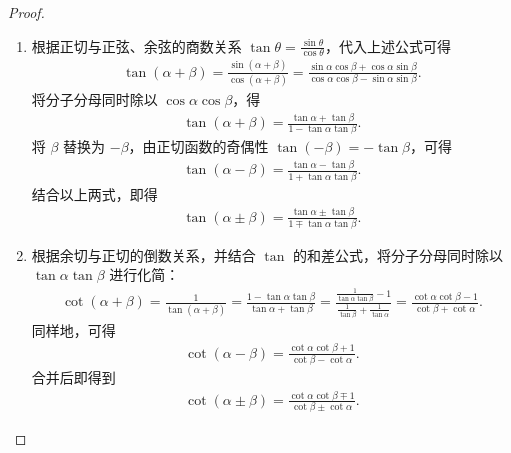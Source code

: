 \documentclass[../../main.tex]{subfiles}%
\begin{document}
\begin{proof}
\begin{enumerate}[(1)]
\item 根据正切与正弦、余弦的商数关系 \(\tan\theta = \frac{\sin\theta}{\cos\theta}\)，代入上述公式可得
\begin{align*}
\tan(\alpha + \beta) = \frac{\sin(\alpha + \beta)}{\cos(\alpha + \beta)} = \frac{\sin\alpha\cos\beta + \cos\alpha\sin\beta}{\cos\alpha\cos\beta - \sin\alpha\sin\beta}.
\end{align*}
将分子分母同时除以 \(\cos\alpha\cos\beta\)，得
\begin{align*}
\tan(\alpha + \beta) = \frac{\tan\alpha + \tan\beta}{1 - \tan\alpha\tan\beta}.
\end{align*}
将 \(\beta\) 替换为 \(-\beta\)，由正切函数的奇偶性 \(\tan(-\beta) = -\tan\beta\)，可得
\begin{align*}
\tan(\alpha - \beta) = \frac{\tan\alpha - \tan\beta}{1 + \tan\alpha\tan\beta}.
\end{align*}
结合以上两式，即得
\begin{align*}
\tan(\alpha \pm \beta) = \frac{\tan\alpha \pm \tan\beta}{1 \mp \tan\alpha\tan\beta}.
\end{align*}

\item 根据余切与正切的倒数关系，并结合 \(\tan\) 的和差公式，将分子分母同时除以 \(\tan\alpha\tan\beta\) 进行化简：
\begin{align*}
\cot(\alpha + \beta) = \frac{1}{\tan(\alpha + \beta)} = \frac{1 - \tan\alpha\tan\beta}{\tan\alpha + \tan\beta} = \frac{\frac{1}{\tan\alpha\tan\beta} - 1}{\frac{1}{\tan\beta} + \frac{1}{\tan\alpha}} = \frac{\cot\alpha\cot\beta - 1}{\cot\beta + \cot\alpha}.
\end{align*}
同样地，可得
\begin{align*}
\cot(\alpha - \beta) = \frac{\cot\alpha\cot\beta + 1}{\cot\beta - \cot\alpha}.
\end{align*}
合并后即得到
\begin{align*}
\cot(\alpha \pm \beta) = \frac{\cot\alpha\cot\beta \mp 1}{\cot\beta \pm \cot\alpha}.
\end{align*}
\end{enumerate}
\end{proof}
\end{document}
